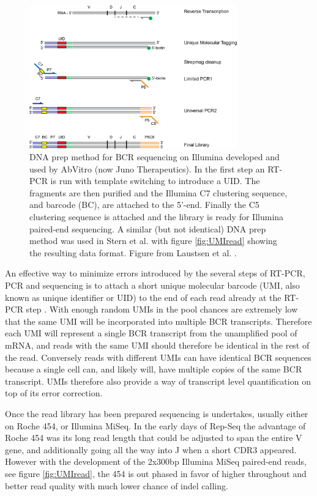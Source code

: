 \begin{figure}[ht]
    \centering
    \includegraphics[width=0.8\textwidth]{figures/BCR_RTPCR_AbVitro.png}
    \caption{
        \label{fig:BCR_RTPCR}
        DNA prep method for BCR sequencing on Illumina developed and used by AbVitro (now Juno Therapeutics).
        In the first step an RT-PCR is run with template switching to introduce a UID.
        The fragments are then purified and the Illumina C7 clustering sequence, and barcode (BC), are attached to the 5'-end.
        Finally the C5 clustering sequence is attached and the library is ready for Illumina paired-end sequencing.
        A similar (but not identical) DNA prep method was used in Stern et al. \cite{stern2014b} with figure \ref{fig:UMIread} showing the resulting data format.
        Figure from Laustsen et al. \cite{laustsen2017exploration}.
    }
\end{figure}

An effective way to minimize errors introduced by the several steps of RT-PCR, PCR and sequencing is to attach a short unique molecular barcode (UMI, also known as unique identifier or UID) to the end of each read already at the RT-PCR step \cite{turchaninova2016high}.
With enough random UMIs in the pool chances are extremely low that the same UMI will be incorporated into multiple BCR transcripts.
Therefore each UMI will represent a single BCR transcript from the unamplified pool of mRNA, and reads with the same UMI should therefore be identical in the rest of the read.
Conversely reads with different UMIs can have identical BCR sequences because a single cell can, and likely will, have multiple copies of the same BCR transcript.
UMIs therefore also provide a way of transcript level quantification on top of its error correction.

Once the read library has been prepared sequencing is undertakes, usually either on Roche 454, or Illumina MiSeq.
In the early days of Rep-Seq the advantage of Roche 454 was its long read length that could be adjusted to span the entire V gene, and additionally going all the way into J when a short CDR3 appeared.
However with the development of the 2x300bp Illumina MiSeq paired-end reads, see figure \ref{fig:UMIread}, the 454 is out phased in favor of higher throughout and better read quality with much lower chance of indel calling.

